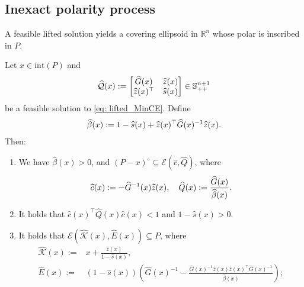\documentclass[smallextended]{svjour3}
\newcommand{\R}{\mathbb{R}}
\newcommand{\K}{\mathcal{K}}
\newcommand{\E}{\mathcal{E}}
\newcommand{\wh}{\widehat}
\renewcommand{\S}{\mathbb{S}}
\begin{document}
\subsection{Inexact polarity process}\label{subsec: inexact_pp}
A feasible lifted solution yields a covering ellipsoid in $\R^n$ whose polar is
inscribed in $P$.
\begin{lemma}\label{lemma: inexact_basic_properties}
    Let $x\in \mathrm{int}(P)$ and
    \begin{align}
       \widehat{\mathcal{Q}}(x) := \begin{bmatrix}
            \widehat{G}(x) & \widehat{z}(x)\\\widehat{z}(x)^\top & \widehat{s}(x)
        \end{bmatrix}
        \in \S^{n+1}_{++} \notag
    \end{align}
    be a feasible solution to \eqref{eq: lifted_MinCE}. Define
    \begin{align}
        \widehat{\beta}(x) := 1 - \widehat{s}(x) + \widehat{z}(x)^\top \widehat{G}(x)^{-1}\widehat{z}(x). \notag
    \end{align}
    Then:
    \begin{enumerate}
        \item  We have $\widehat{\beta}(x) > 0$, and $(P-x)^\circ \subseteq \E(\widehat{c}, \widehat{Q})$, where
            \begin{align}
                \widehat{c}(x): = -\widehat{G}^{-1}(x) \widehat{z}(x), \quad \widehat{Q}(x) := \frac{\widehat{G}(x)}{\widehat{\beta}(x)}. \notag
            \end{align}
        \item It holds that $\wh{c}(x)^\top \wh{Q}(x) \wh{c}(x) < 1$ and $1 - \wh{s}(x) > 0$.
        \item It holds that $\E(\wh{\K}(x), \wh{E}(x)) \subseteq P$, where
        \begin{align*}
            \wh{\K}(x) := & x + \frac{\wh{z}(x)}{1-\wh{s}(x)}, \\
            \wh{E}(x) := & (1-\wh{s}(x)) \left(\wh{G}(x)^{-1} - \frac{\wh{G}(x)^{-1}\wh{z}(x)\wh{z}(x)^{\top}\wh{G}(x)^{-1}}{\wh{\beta}(x)}\right);
        \end{align*}
    \end{enumerate}
\end{lemma}
\end{document}
